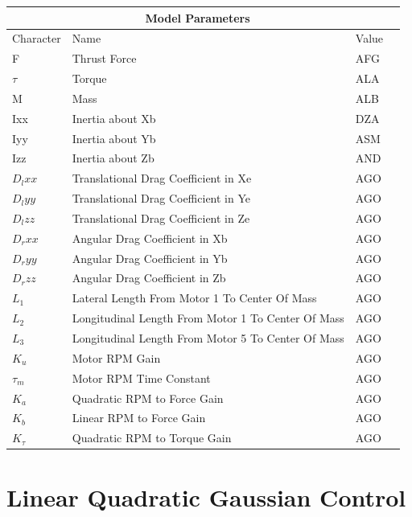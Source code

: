 \documentclass[12pt,a4paper,twoside]{report}
\begin{document}
			\begin{tabular}{ |p{2cm}||p{10cm}|p{3cm}|p{3cm}|  }
				\hline
				\multicolumn{3}{|c|}{Model Parameters} \\
				\hline
				Character& Name  & Value  \\
				\hline
				F        &  Thrust Force                                         & AFG\\
				$\tau$   &  Torque                                               & ALA\\
				M        &  Mass                                                 & ALB\\
				Ixx      &  Inertia about Xb                                     & DZA\\
				Iyy      &  Inertia about Yb                                     & ASM\\
				Izz      &  Inertia about Zb                                     & AND\\
				$D_lxx$  &  Translational Drag Coefficient in Xe                 & AGO\\
				$D_lyy$  &  Translational Drag Coefficient in Ye                 & AGO\\
				$D_lzz$  &  Translational Drag Coefficient in Ze                 & AGO\\
				$D_rxx$  &  Angular Drag Coefficient in Xb                       & AGO\\
				$D_ryy$  &  Angular Drag Coefficient in Yb                       & AGO\\
				$D_rzz$  &  Angular Drag Coefficient in Zb                       & AGO\\
				$L_1$    &  Lateral Length From Motor 1 To Center Of Mass        & AGO\\
				$L_2$    &  Longitudinal Length From Motor 1 To Center Of Mass   & AGO\\
				$L_3$    &  Longitudinal Length From Motor 5 To Center Of Mass   & AGO\\
				$K_u$    &  Motor RPM Gain                                       & AGO\\
				$\tau_m$ &  Motor RPM Time Constant                              & AGO\\
				$K_a$    &  Quadratic RPM to Force Gain                          & AGO\\
				$K_b$    &  Linear RPM to Force Gain                             & AGO\\
				$K_\tau$ &  Quadratic RPM to Torque Gain                         & AGO\\
				\hline
			\end{tabular}
			
			\newpage
	\section{Linear Quadratic Gaussian Control}
		
		\newpage
						
				
\end{document}
